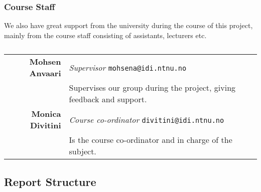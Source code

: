 \subsubsection{Course Staff}
We also have great support from the university during the course of this project, mainly from the course staff consisting of assistants, lecturers etc.

\begin{table}[!ht]
\begin{tabular}{r|p{11cm}}
\textbf{Mohsen Anvaari} & \emph{Supervisor}   \texttt{mohsena@idi.ntnu.no}\\[6pt]
& Supervises our group during the project, giving feedback and support. \\[8pt]
\textbf{Monica Divitini} & \emph{Course co-ordinator}   \texttt{divitini@idi.ntnu.no}\\[6pt]
& Is the course co-ordinator and in charge of the subject.\\
\end{tabular}
\captionsetup{textformat=empty,labelformat=blank}
\caption[Course Staff]{}
\end{table}

\clearpage
\subsection{Report Structure}

